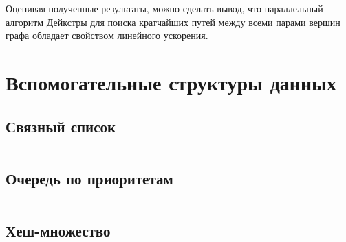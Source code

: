\documentclass[12pt, a4paper]{article}
\begin{document}
Оценивая полученные результаты, можно сделать вывод, что параллельный алгоритм Дейкстры для поиска кратчайших
путей между всеми парами вершин графа обладает свойством линейного ускорения.

\newpage

\section{Вспомогательные структуры данных}
\subsection{Связный список}
\inputminted[firstline=6]{c}{/home/mehandes/c/src/github.com/paraskun/math/dsa/src/sll/psll.c}

\subsection{Очередь по приоритетам}
\inputminted[firstline=8]{c}{/home/mehandes/c/src/github.com/paraskun/math/dsa/src/pque/ppque.c}

\subsection{Хеш-множество}
\inputminted[firstline=8]{c}{/home/mehandes/c/src/github.com/paraskun/math/dsa/src/hset/uhset.c}
\end{document}
